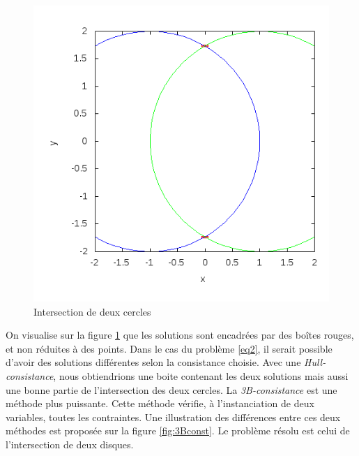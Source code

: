  \begin{figure}[ht!] %
   \center
 \includegraphics[scale=0.55]{img/circle-circle}
   \caption{Intersection de deux cercles} %
  \label{fig:Deuxcerlces} %
\end{figure} %
On visualise sur la figure \ref{fig:Deuxcerlces} que les solutions sont encadrées par des \og boîtes \fg{} rouges, et non réduites à des points. 
\clearpage
Dans le cas du problème \ref{eq2}, il serait possible d'avoir des solutions différentes selon la consistance choisie. Avec une \emph{Hull-consistance}, nous obtiendrions une boite contenant les deux solutions mais aussi une bonne partie de l'intersection des deux cercles. La \emph{3B-consistance} est une méthode plus puissante. Cette méthode vérifie, à l'instanciation de deux variables, toutes les contraintes. Une illustration des différences entre ces deux méthodes est proposée sur la figure \ref{fig:3Bconst}. Le problème résolu est celui de l'intersection de deux disques.
